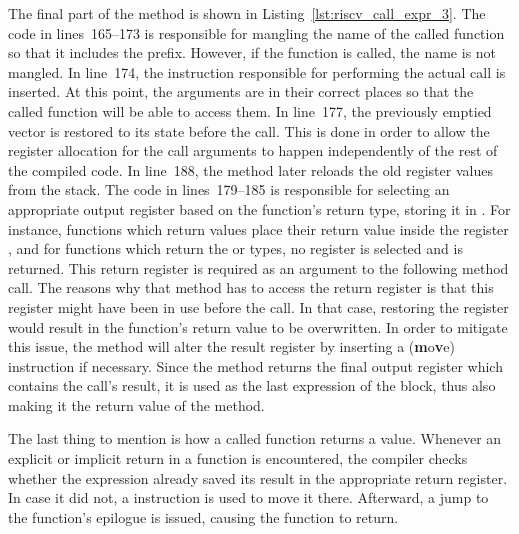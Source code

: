
The final part of the  method is shown in Listing~\ref{lst:riscv_call_expr_3}.
The code in lines~165--173 is responsible for mangling the name of the called function so that it includes the  prefix.
However, if the  function is called, the name is not mangled.
In line~174, the  instruction responsible for performing the actual call is inserted.
At this point, the arguments are in their correct places so that the called function will be able to access them.
In line~177, the previously emptied  vector is restored to its state before the call.
This is done in order to allow the register allocation for the call arguments to happen independently of the rest of the compiled code.
In line~188, the method  later reloads the old register values from the stack.
The code in lines~179--185 is responsible for selecting an appropriate output register based on the function's return type, storing it in .
For instance, functions which return  values place their return value inside the register , and for functions which return the \qVerb{()} or \qVerb{!} types, no register is selected and  is returned.
This return register is required as an argument to the following  method call.
The reasons why that method has to access the return register is that this register might have been in use before the call.
In that case, restoring the register would result in the function's return value to be overwritten.
In order to mitigate this issue, the method will alter the result register by inserting a  (\textbf{m}o\textbf{v}e) instruction if necessary.
Since the method returns the final output register which contains the call's result, it is used as the last expression of the block, thus also making it the return value of the  method.

The last thing to mention is how a called function returns a value.
Whenever an explicit or implicit return in a function is encountered,
the compiler checks whether the expression already saved its result in the appropriate return register.
In case it did not, a  instruction is used to move it there.
Afterward, a jump to the function's epilogue is issued, causing the function to return.

